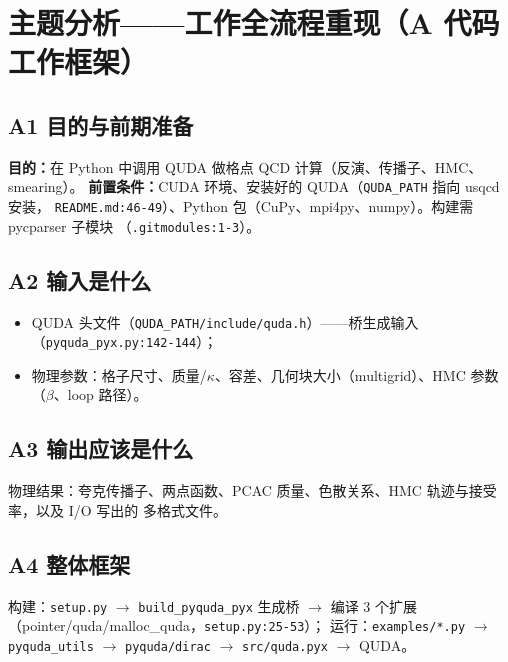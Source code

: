 \documentclass[UTF8]{ctexart}
\begin{document}
\section{主题分析——工作全流程重现（A 代码工作框架）}

\subsection{A1 目的与前期准备}
\textbf{目的：}在 Python 中调用 QUDA 做格点 QCD 计算（反演、传播子、HMC、smearing）。
\textbf{前置条件：}CUDA 环境、安装好的 QUDA（\texttt{QUDA\_PATH} 指向 usqcd 安装，
\texttt{README.md:46-49}）、Python 包（CuPy、mpi4py、numpy）。构建需 pycparser 子模块
（\texttt{.gitmodules:1-3}）。

\subsection{A2 输入是什么}
\begin{itemize}
  \item QUDA 头文件（\texttt{QUDA\_PATH/include/quda.h}）——桥生成输入
        （\texttt{pyquda\_pyx.py:142-144}）；
  \item 物理参数：格子尺寸、质量/$\kappa$、容差、几何块大小（multigrid）、HMC 参数（$\beta$、loop 路径）。
\end{itemize}

\subsection{A3 输出应该是什么}
物理结果：夸克传播子、两点函数、PCAC 质量、色散关系、HMC 轨迹与接受率，以及 I/O 写出的
多格式文件。

\subsection{A4 整体框架}
构建：\texttt{setup.py} $\rightarrow$ \texttt{build\_pyquda\_pyx} 生成桥 $\rightarrow$
编译 3 个扩展（pointer/quda/malloc\_quda，\texttt{setup.py:25-53}）；
运行：\texttt{examples/*.py} $\rightarrow$ \texttt{pyquda\_utils} $\rightarrow$
\texttt{pyquda/dirac} $\rightarrow$ \texttt{src/quda.pyx} $\rightarrow$ QUDA。
\end{document}

